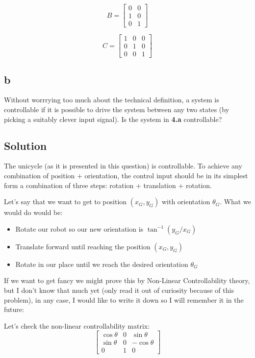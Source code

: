 \documentclass[10pt,a4paper]{article}
\begin{document}
\[ B = 
\begin{bmatrix}
0 & 0 \\
1 & 0 \\
0 & 1
\end{bmatrix}
\]

\[ C =
\begin{bmatrix}
1 & 0 & 0 \\
0 & 1 & 0 \\
0 & 0 & 1
\end{bmatrix}
\]

\subsection*{b}
Without worrrying too much about the  technical definition, a system is controllable if it is possible to drive the system between any two states (by picking a suitably clever input signal). Is the system in {\bf 4.a} controllable?
\subsection*{Solution}
The unicycle (as it is presented in this question) is controllable. To achieve any combination of position $+$ orientation, the control input should be in its simplest form a combination of three steps: rotation + translation + rotation.
\medskip
 
Let's say that we want to get to position $(x_{G},y_{G})$ with orientation $\theta_{G}$. What we would do would be:

\begin{itemize}
\item{Rotate our robot so our new orientation is $\tan^{-1}(y_{G}/x_{G})$}
\item{Translate forward until reaching the position  $(x_{G},y_{G})$}
\item{Rotate in our place until we reach the desired orientation $\theta_{G}$}
\end{itemize}

If we want to get fancy we might prove this by Non-Linear Controllability theory, but I don't know that much yet (only read it out of curiosity because of this problem), in any case, I would like to write it down so I will remember it in the future:

Let's check the non-linear controllability matrix: 
\[
\begin{bmatrix}
\cos \theta & 0 & \sin \theta \\
\sin \theta & 0 & -\cos \theta \\
0 & 1 & 0
\end{bmatrix}
\]
\end{document}
